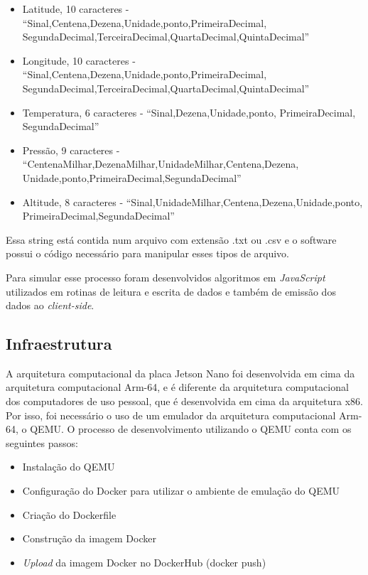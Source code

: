 \begin{itemize}
    \item Latitude, 10 caracteres - “Sinal,Centena,Dezena,Unidade,ponto,PrimeiraDecimal,
    SegundaDecimal,TerceiraDecimal,QuartaDecimal,QuintaDecimal”
    \item Longitude, 10 caracteres - “Sinal,Centena,Dezena,Unidade,ponto,PrimeiraDecimal,
    SegundaDecimal,TerceiraDecimal,QuartaDecimal,QuintaDecimal”
   \item Temperatura, 6 caracteres - “Sinal,Dezena,Unidade,ponto,
   PrimeiraDecimal, 
   SegundaDecimal”
   \item Pressão, 9 caracteres - “CentenaMilhar,DezenaMilhar,UnidadeMilhar,Centena,Dezena,
   Unidade,ponto,PrimeiraDecimal,SegundaDecimal”
    \item Altitude, 8 caracteres - “Sinal,UnidadeMilhar,Centena,Dezena,Unidade,ponto,
    PrimeiraDecimal,SegundaDecimal”
\end{itemize}

Essa string está contida num arquivo com extensão .txt ou .csv e o software possui o código necessário para manipular esses tipos de arquivo.

Para simular esse processo foram desenvolvidos algoritmos em \textit{JavaScript} utilizados em rotinas de leitura e escrita de dados e também de emissão dos dados ao \textit{client-side}.

\subsection{Infraestrutura}

A arquitetura computacional da placa Jetson Nano foi desenvolvida em cima da arquitetura computacional Arm-64, e é diferente da arquitetura computacional dos computadores de uso pessoal, que é desenvolvida em cima da arquitetura x86. Por isso, foi necessário o uso de um emulador da arquitetura computacional Arm-64, o QEMU.
O processo de desenvolvimento utilizando o QEMU conta com os seguintes passos:
\begin{itemize}
    \item Instalação do QEMU
    \item Configuração do Docker para utilizar o ambiente de emulação do QEMU
    \item Criação do Dockerfile
    \item Construção da imagem Docker
    \item \textit{Upload} da imagem Docker no DockerHub (docker push)
\end{itemize}

